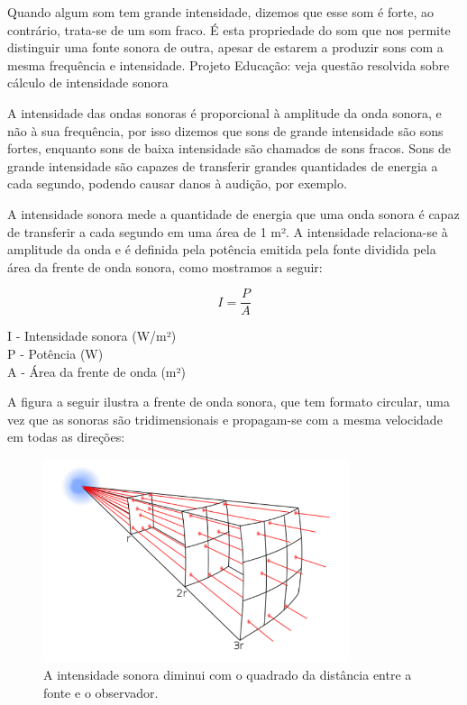\documentclass[
	article,		
	11pt,			
	oneside,		
	a4paper,			
	english,			
	brazil			
]{abntex2}
\begin{document}
Quando algum som tem grande intensidade, dizemos que esse som é forte, ao contrário, trata-se de um som fraco. É esta propriedade do som que nos permite distinguir uma fonte sonora de outra, apesar de estarem a produzir sons com a mesma frequência e intensidade. Projeto Educação: veja questão resolvida sobre cálculo de intensidade sonora

A intensidade das ondas sonoras é proporcional à amplitude da onda sonora, e não à sua frequência, por isso dizemos que sons de grande intensidade são sons fortes, enquanto sons de baixa intensidade são chamados de sons fracos. Sons de grande intensidade são capazes de transferir grandes quantidades de energia a cada segundo, podendo causar danos à audição, por exemplo.\cite{HELERBROCKIntensidadeSomBrasilEscola}

A intensidade sonora mede a quantidade de energia que uma onda sonora é capaz de transferir a cada segundo em uma área de 1 m². A intensidade relaciona-se à amplitude da onda e é definida pela potência emitida pela fonte dividida pela área da frente de onda sonora, como mostramos a seguir:

\begin{equation}
    I=\frac{P}{A}
\end{equation}

\begin{center}
I - Intensidade sonora (W/m²)\\
P - Potência (W)\\
A - Área da frente de onda (m²)
\end{center}

A figura a seguir ilustra a frente de onda sonora, que tem formato circular, uma vez que as sonoras são tridimensionais e propagam-se com a mesma velocidade em todas as direções:
\begin{figure}[h]
    \includegraphics[width=0.80\textwidth]{./imagens/intensidade-do-som-e-distancia-2.jpg}
    \centering
    \caption{A intensidade sonora diminui com o quadrado da distância entre a fonte e o observador.}
    \label{fig:Intencidade sonora}
\end{figure}
\end{document}
